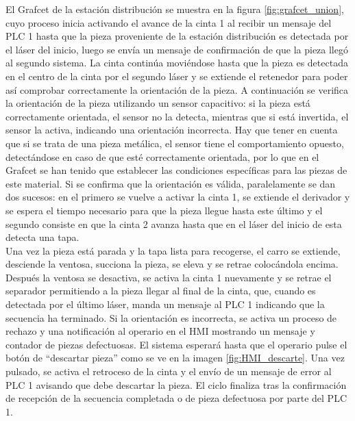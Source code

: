 El Grafcet de la estación distribución se muestra en la figura \ref{fig:grafcet_union}, cuyo proceso inicia activando el avance de la cinta 1 al recibir un mensaje del PLC 1 hasta que la pieza proveniente de la estación distribución es detectada por el láser del inicio, luego se envía un mensaje de confirmación de que la pieza llegó al segundo sistema. La cinta continúa moviéndose hasta que la pieza es detectada en el centro de la cinta por el segundo láser y se extiende el retenedor para poder así comprobar correctamente la orientación de la pieza. A continuación se verifica la orientación de la pieza utilizando un sensor capacitivo: si la pieza está correctamente orientada, el sensor no la detecta, mientras que si está invertida, el sensor la activa, indicando una orientación incorrecta. Hay que tener en cuenta que si se trata de una pieza metálica, el sensor tiene el comportamiento opuesto, detectándose en caso de que esté correctamente orientada, por lo que en el Grafcet se han tenido que establecer las condiciones específicas para las piezas de este material. Si se confirma que la orientación es válida, paralelamente se dan dos sucesos: en el primero se vuelve a activar la cinta 1, se extiende el derivador y se espera el tiempo necesario para que la pieza llegue hasta este último y el segundo consiste en que la cinta 2 avanza hasta que en el láser del inicio de esta detecta una tapa. \\

Una vez la pieza está parada y la tapa lista para recogerse, el carro se extiende, desciende la ventosa, succiona la pieza, se eleva y se retrae colocándola encima. Después la ventosa se desactiva, se activa la cinta 1 nuevamente y se retrae el separador permitiendo a la pieza llegar al final de la cinta, que, cuando es detectada por el último láser, manda un mensaje al PLC 1 indicando que la secuencia ha terminado. Si la orientación es incorrecta, se activa un proceso de rechazo y una notificación al operario en el HMI mostrando un mensaje y contador de piezas defectuosas. El sistema esperará hasta que el operario pulse el botón de “descartar pieza” como se ve en la imagen \ref{fig:HMI_descarte}. Una vez pulsado, se activa el retroceso de la cinta y el envío de un mensaje de error al PLC 1 avisando que debe descartar la pieza. El ciclo finaliza tras la confirmación de recepción de la secuencia completada o de pieza defectuosa por parte del PLC 1.

\clearpage
 

